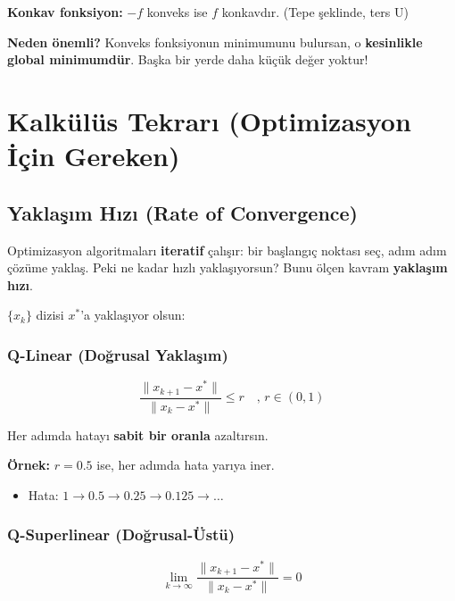 \documentclass[12pt,a4paper]{article}
\theoremstyle{definition}
\theoremstyle{remark}
\begin{document}
\textbf{Konkav fonksiyon:} $-f$ konveks ise $f$ konkavd{\i}r. (Tepe \c{s}eklinde, ters U)

\textbf{Neden \"onemli?} Konveks fonksiyonun minimumunu bulursan, o \textbf{kesinlikle global minimumd\"ur}. Ba\c{s}ka bir yerde daha k\"u\c{c}\"uk de\u{g}er yoktur!

\newpage

\section{Kalk\"ul\"us Tekrar{\i} (Optimizasyon \.{I}\c{c}in Gereken)}

\subsection{Yakla\c{s}{\i}m H{\i}z{\i} (Rate of Convergence)}

Optimizasyon algoritmalar{\i} \textbf{iteratif} \c{c}al{\i}\c{s}{\i}r: bir ba\c{s}lang{\i}\c{c} noktas{\i} se\c{c}, ad{\i}m ad{\i}m \c{c}\"oz\"ume yakla\c{s}.
Peki ne kadar h{\i}zl{\i} yakla\c{s}{\i}yorsun? Bunu \"ol\c{c}en kavram \textbf{yakla\c{s}{\i}m h{\i}z{\i}}.

$\{x_k\}$ dizisi $x^*$'a yakla\c{s}{\i}yor olsun:

\subsubsection{Q-Linear (Do\u{g}rusal Yakla\c{s}{\i}m)}

\[
\frac{\|x_{k+1} - x^*\|}{\|x_k - x^*\|} \leq r \quad \text{, } r \in (0,1)
\]

Her ad{\i}mda hatay{\i} \textbf{sabit bir oranla} azalt{\i}rs{\i}n.

\textbf{\"Ornek:} $r = 0.5$ ise, her ad{\i}mda hata yar{\i}ya iner.
\begin{itemize}
    \item Hata: $1 \to 0.5 \to 0.25 \to 0.125 \to \ldots$
\end{itemize}

\subsubsection{Q-Superlinear (Do\u{g}rusal-\"Ust\"u)}

\[
\lim_{k \to \infty} \frac{\|x_{k+1} - x^*\|}{\|x_k - x^*\|} = 0
\]
\end{document}

